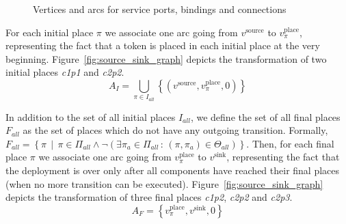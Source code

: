 \begin{figure}[h]
{\begin{minipage}[c]{1.3\columnwidth}
    \end{minipage}
  }
  \caption{Vertices and arcs for service ports, bindings and connections}
  \label{fig:service_ports_graph}
\end{figure}

For each initial place $\pi$ we associate one arc going from $v^\text{source}$
 to $v_\pi^\text{place}$, representing the fact that a token is placed in each
 initial place at the very beginning.
Figure~\ref{fig:source_sink_graph} depicts the transformation of two initial
places \emph{c1p1} and \emph{c2p2}.
\[
A_{I}=\bigcup_{\pi\in I_{all}}\left\{ \left(v^\text{source},v_\pi^\text{place},0\right)\right\} 
\]

In addition to the set of all initial places $I_{all}$, we define
the set of all final places $F_{all}$ as the set of places which
do not have any outgoing transition. Formally,
$F_{all}=\left\{ \pi\,\mid\,\pi\in\Pi_{all}\land\lnot\left(\exists\pi_{a}\in\Pi_{all}\,:\,\left(\pi,\pi_{a}\right)\in\Theta_{all}\right)\right\} $.
Then, for each final place $\pi$ we associate one arc going from
$v_\pi^\text{place}$ to $v^\text{sink}$, representing the fact that the
deployment is over only after all components have reached their final places
(\ie when no more transition can be executed).
Figure~\ref{fig:source_sink_graph} depicts the transformation of three final
places \emph{c1p2}, \emph{c2p2} and \emph{c2p3}.
\[
A_{F}=\left\{ v_\pi^\text{place},v^\text{sink},0\right\} 
\]

